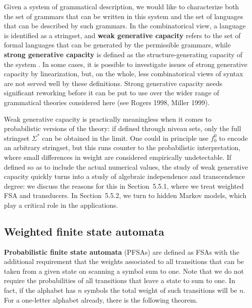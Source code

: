 Given a system of grammatical description, 
we would like to characterize both the set of grammars that can be written in
this system and the set of languages that can be described by such grammars.
In the combinatorical view, a language is identified as a stringset, and {\bf
  weak generative capacity} refers to the set of formal languages that can be
generated by the permissible grammars, while {\bf strong generative capacity}
is defined as the structure-generating capacity of the system
\cite{Chomsky:1965a}. In some cases, it is possible to investigate issues of
strong generative capacity by linearization, but, on the whole, less
combinatorical views of syntax are not served well by these definitions.
Strong generative capacity needs significant reworking before it can be put to
use over the wider range of grammatical theories considered here (see Rogers
1998, Miller 1999). \nocite{Rogers:1998} \nocite{Miller:1999}

Weak generative capacity is practically meaningless when it comes to
probabilistic versions of the theory: if defined through niveau sets, only the
full stringset $\Sigma^*$ can be obtained in the limit. One could in principle
use $f_0^0$ to encode an arbitrary stringset, but this runs counter to the
probabilistic interpretation, where small differences in weight are considered
empirically undetectable. If defined so as to include the actual numerical
values, the study of weak generative capacity quickly turns into a study of
algebraic independence and transcendence degree: we discuss the reasons for
this in Section~5.5.1, where we treat weighted FSA and transducers. In
Section~5.5.2, we turn to hidden Markov models, which play a critical role in
the applications.

\subsection{Weighted finite state automata}

{\bf Probabilistic finite state automata} (PFSAs) are defined as FSAs
with the additional requirement that the weights associated to all transitions
that can be taken from a given state on scanning a symbol sum to one.
 Note that we do not
require the probabilities of all transitions that leave a state to sum to one.
In fact, if the alphabet has $n$ symbols the total weight of such transitions
will be $n$. For a one-letter alphabet already, there is the following theorem.

